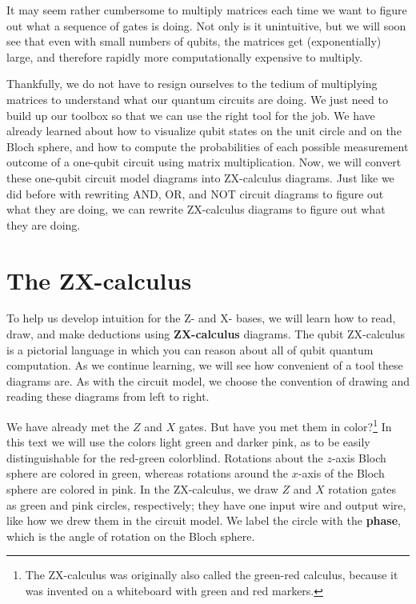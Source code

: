 \documentclass{article}
\theoremstyle{definition}
\begin{document}
It may seem rather cumbersome to multiply matrices each time we want to figure out what a sequence of gates is doing.  Not only is it unintuitive, but we will soon see that even with small numbers of qubits, the matrices get (exponentially) large, and therefore rapidly more computationally expensive to multiply.

Thankfully, we do not have to resign ourselves to the tedium of multiplying matrices to understand what our quantum circuits are doing.  We just need to build up our toolbox so that we can use the right tool for the job.  We have already learned about how to visualize qubit states on the unit circle and on the Bloch sphere, and how to compute the probabilities of each possible measurement outcome of a one-qubit circuit using matrix multiplication.  Now, we will convert these one-qubit circuit model diagrams into ZX-calculus diagrams.  Just like we did before with rewriting AND, OR, and NOT circuit diagrams to figure out what they are doing, we can rewrite ZX-calculus diagrams to figure out what they are doing.

\section{The ZX-calculus}
To help us develop intuition for the Z- and X- bases, we will learn how to read, draw, and make deductions using \textbf{ZX-calculus} diagrams.  The qubit ZX-calculus is a pictorial language in which you can reason about all of qubit quantum computation.  As we continue learning, we will see how convenient of a tool these diagrams are.  As with the circuit model, we choose the convention of drawing and reading these diagrams from left to right.

We have already met the $Z$ and $X$ gates.  But have you met them in color?\footnote{The ZX-calculus was originally also called the green-red calculus, because it was invented on a whiteboard with green and red markers.}  In this text we will use the colors light green and darker pink, as to be easily distinguishable for the red-green colorblind.  Rotations about the $z$-axis Bloch sphere are colored in green, whereas rotations around the $x$-axis of the Bloch sphere are colored in pink.  In the ZX-calculus, we draw $Z$ and $X$ rotation gates as green and pink circles, respectively; they have one input wire and output wire, like how we drew them in the circuit model.  We label the circle with the \textbf{phase}, which is the angle of rotation on the Bloch sphere.
\end{document}
